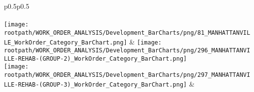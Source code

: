 \begin{center}
                                \tablehead{\hspace{1cm}\\}
                                \tabletail{\hspace{1cm}\\}
                                \begin{supertabular}{p{0.5\textwidth}p{0.5\textwidth}}
                                \shrinkheight{1in}
                                 \\
                                 \\
                                \texttt{[image: \\rootpath/WORK\_ORDER\_ANALYSIS/Development\_BarCharts/png/81\_MANHATTANVILLE\_WorkOrder\_Category\_BarChart.png]} & \texttt{[image: \\rootpath/WORK\_ORDER\_ANALYSIS/Development\_BarCharts/png/296\_MANHATTANVILLE-REHAB-(GROUP-2)\_WorkOrder\_Category\_BarChart.png]} \\
                                        \texttt{[image: \\rootpath/WORK\_ORDER\_ANALYSIS/Development\_BarCharts/png/297\_MANHATTANVILLE-REHAB-(GROUP-3)\_WorkOrder\_Category\_BarChart.png]} &  \hspace{1cm} \\
                                        \end{supertabular}
\end{center}

